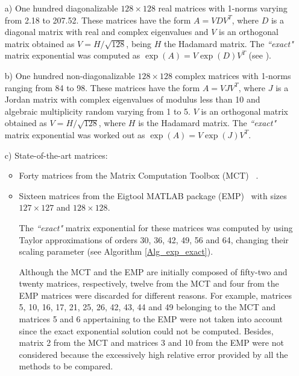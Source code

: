 \begin{itemize}
        \item[a)]  One hundred diagonalizable  $128 \times 128$ real matrices with 1-norms varying from 2.18 to 207.52. These matrices have the form  $A=VDV^T$, where
        $D$ is a diagonal matrix with real and complex eigenvalues and $V$ is an
        orthogonal matrix obtained as $V=H/\sqrt{128}$, being $H$ the Hadamard matrix.
        The {\it``exact"} matrix exponential was computed as $\exp(A)=V\exp(D)V^T$ (see \cite[pp. 10]{High08}).         

        \item[b)] One hundred non-diagonalizable $128 \times 128$ complex matrices with 1-norms ranging from 84 to 98. These matrices have the form $A=VJV^T$, where $J$ is a Jordan matrix with complex eigenvalues of modulus less than 10 and algebraic multiplicity random varying from 1 to 5. $V$ is an orthogonal matrix obtained as $V=H/\sqrt{128}$, where $H$ is the Hadamard matrix.
        The {\it``exact"} matrix exponential was worked out as $\exp(A)=V\exp(J)V^T$.         
        \item[c)] State-of-the-art matrices:\begin{itemize}
        \item Forty matrices from the Matrix Computation Toolbox (MCT) ~\cite{higham1995test}.
        \item Sixteen matrices from the Eigtool MATLAB package (EMP)~\cite{wrighteigtool} with sizes $127 \times 127$ and $128 \times 128$.
        
                         The {\it``exact"} matrix exponential for these matrices was computed by using Taylor approximations of orders 30, 36, 42, 49, 56 and 64, changing their scaling parameter (see Algorithm \ref{Alg_exp_exact}).         
        
                 Although the MCT and the EMP are initially composed of fifty-two and twenty matrices, respectively, twelve from the MCT and four from the EMP matrices were discarded for different reasons. For example, matrices 5, 10, 16, 17, 21, 25, 26, 42, 43, 44 and 49 belonging to the MCT and matrices 5 and 6 appertaining to the EMP were not taken into account since the exact exponential solution could not be computed. Besides, matrix 2 from the MCT and matrices 3 and 10 from the EMP were not considered because the excessively high relative error provided by all the methods to be compared.   
\end{itemize}         
       
\end{itemize}

